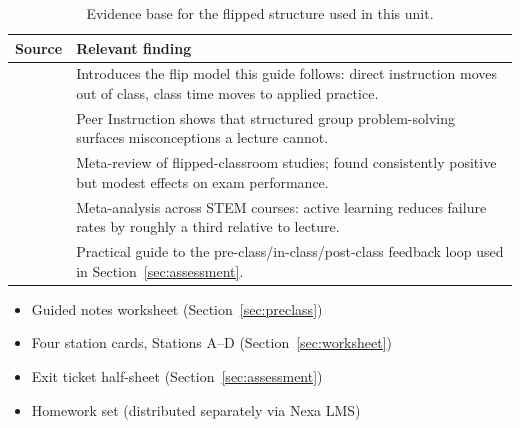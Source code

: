 \begin{table}[H]
\centering
\small
\begin{tabularx}{\textwidth}{@{}l X@{}}
\toprule
\textbf{Source} & \textbf{Relevant finding} \\
\midrule
\citet{bergmann2012flip} & Introduces the flip model this guide follows: direct instruction moves out of class, class time moves to applied practice. \\
\citet{mazur1997peer} & Peer Instruction shows that structured group problem-solving surfaces misconceptions a lecture cannot. \\
\citet{bishop2013flipped} & Meta-review of flipped-classroom studies; found consistently positive but modest effects on exam performance. \\
\citet{freeman2014active} & Meta-analysis across STEM courses: active learning reduces failure rates by roughly a third relative to lecture. \\
\citet{talbert2017flipped} & Practical guide to the pre-class/in-class/post-class feedback loop used in Section~\ref{sec:assessment}. \\
\bottomrule
\end{tabularx}
\caption{Evidence base for the flipped structure used in this unit.}
\label{tab:evidence}
\end{table}

\begin{materialsbox}[title={\faFile\ Printable Handouts for This Unit}]
\begin{itemize}[label=\textbullet]
  \item Guided notes worksheet (Section~\ref{sec:preclass})
  \item Four station cards, Stations A--D (Section~\ref{sec:worksheet})
  \item Exit ticket half-sheet (Section~\ref{sec:assessment})
  \item Homework set (distributed separately via Nexa LMS)
\end{itemize}
\end{materialsbox}
